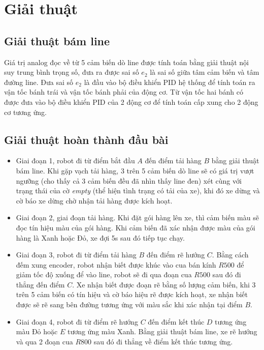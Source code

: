     \section{Giải thuật}
          \subsection{Giải thuật bám line}
               \hspace*{0.6cm}Giá trị analog đọc về từ 5 cảm biến dò line được tính toán bằng giải thuật nội suy
               trung bình trọng số, đưa ra được sai số $e_2$ là sai số giữa tâm cảm biến và tâm đường
               line. Đưa sai số $e_2$ là đầu vào bộ điều khiển PID hệ thống để tính toán ra vận tốc
               bánh trái và vận tốc bánh phải của động cơ. Từ vận tốc hai bánh có được đưa vào bộ
               điều khiển PID của 2 động cơ để tính toán cấp xung cho 2 động cơ tương ứng.
          \subsection{Giải thuật hoàn thành đầu bài}
               \begin{itemize}
                    \item Giai đoạn 1, robot đi từ điểm bắt đầu $A$ đến điểm tải hàng $B$ bằng giải thuật bám line. Khi gặp vạch tải hàng, 3 trên 5 cảm biến dò line sẽ có giá trị vượt ngưỡng (cho thấy cả 3 cảm biến đều đã nhìn thấy line đen)
               xét cùng với trạng thái của cờ \textit{empty} (thể hiện tình trạng có tải của xe), khi đó xe dừng và cờ báo xe dừng chờ nhận tải hàng được kích hoạt.
                    \item Giai đoạn 2, giai đoạn tải hàng. Khi đặt gói hàng lên xe, thì cảm biến màu sẽ đọc
               tín hiệu màu của gói hàng. Khi cảm biến đã xác nhận được màu của gói hàng là Xanh hoặc
               Đỏ, xe đợi 5s sau đó tiếp tục chạy.
                    \item Giai đoạn 3, robot đi từ điểm tải hàng $B$ đến điểm rẽ hướng $C$. Bằng cách đếm xung encoder, robot nhận biết được khúc vào cua bán kính $R500$ để giảm tốc độ xuống để vào line, robot sẽ đi qua đoạn cua $R500$ sau đó đi thẳng đến điểm $C$. Xe nhận biết
               được đoạn rẽ bằng số lượng cảm biến, khi 3 trên 5 cảm biến có tín hiệu và cờ báo hiệu rẽ được kích hoạt,
               xe nhận biết được sẽ rẽ sang bên đường tương ứng với màu sắc khi xác nhận tại điểm $B$.
                    \item Giai đoạn 4, robot đi từ điểm rẽ hướng $C$ đến điểm kết thúc $D$ tương ứng màu Đỏ
               hoặc $E$ tương ứng màu Xanh. Bằng giải thuật bám line, xe rẽ hướng và qua 2 đoạn
               cua $R800$ sau đó đi thẳng về điểm kết thúc tương ứng.
               \end{itemize}
               
